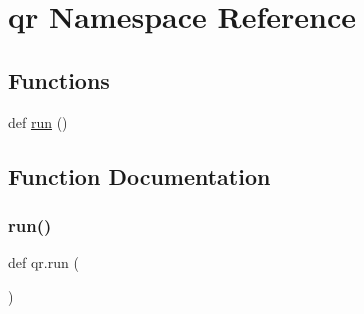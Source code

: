 \hypertarget{namespaceqr}{}\section{qr Namespace Reference}
\label{namespaceqr}
\subsection*{Functions}
\begin{DoxyCompactItemize}
\item 
def \hyperlink{namespaceqr_a08979de8fb3cd9fba5a325b84cdb4380}{run} ()
\end{DoxyCompactItemize}


\subsection{Function Documentation}
\mbox{\label{namespaceqr_a08979de8fb3cd9fba5a325b84cdb4380}} 
\subsubsection{\texorpdfstring{run()}{run()}}
{\footnotesize\ttfamily def qr.\+run (\begin{DoxyParamCaption}{ }\end{DoxyParamCaption})}

